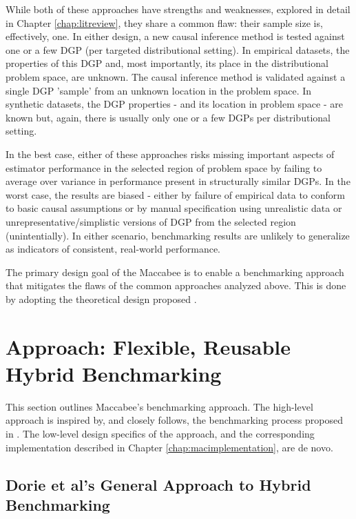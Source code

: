\documentclass[../main.tex]{subfiles}
\begin{document}
While both of these approaches have strengths and weaknesses, explored in detail in Chapter \ref{chap:litreview}, they share a common flaw: their sample size is, effectively, one. In either design, a new causal inference method is tested against one or a few DGP (per targeted distributional setting). In empirical datasets, the properties of this DGP and, most importantly, its place in the distributional problem space, are unknown. The causal inference method is validated against a single DGP 'sample' from an unknown location in the problem space. In synthetic datasets, the DGP properties - and its location in problem space - are known but, again, there is usually only one or a few DGPs per distributional setting.

\vspace{\baselineskip}

In the best case, either of these approaches risks missing important aspects of estimator performance in the selected region of problem space by failing to average over variance in performance present in structurally similar DGPs. In the worst case, the results are biased - either by failure of empirical data to conform to basic causal assumptions or by manual specification using unrealistic data or unrepresentative/simplistic versions of DGP from the selected region (unintentially). In either scenario, benchmarking results are unlikely to generalize as indicators of consistent, real-world performance.

\vspace{\baselineskip}

The primary design goal of the Maccabee is to enable a benchmarking approach that mitigates the flaws of the common approaches analyzed above. This is done by adopting the theoretical design proposed \textcite{Dorie2019Automated1}.

\section{Approach: Flexible, Reusable Hybrid Benchmarking}
\label{mac:approach}

This section outlines Maccabee's benchmarking approach. The high-level approach is inspired by, and closely follows, the benchmarking process proposed in \textcite{Dorie2019Automated1}. The low-level design specifics of the approach, and the corresponding implementation described in Chapter \ref{chap:macimplementation}, are de novo.

\subsection{Dorie et al's General Approach to Hybrid Benchmarking}
\label{mac:generalapproach}
\end{document}
